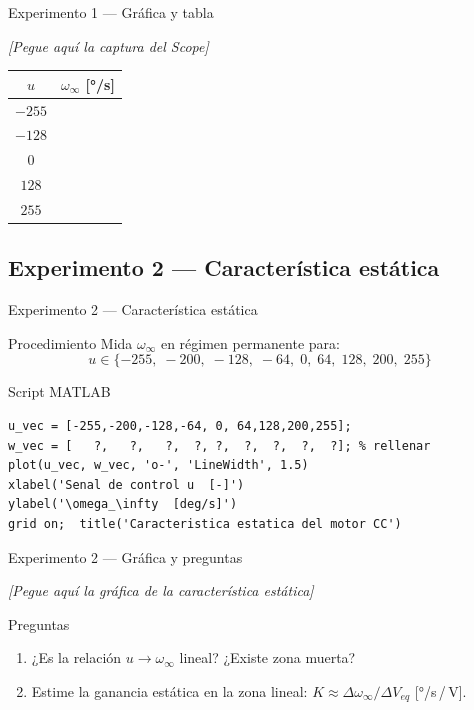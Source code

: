 \documentclass{beamer}
\begin{document}
\begin{frame}{Experimento 1 --- Gráfica y tabla}
\begin{center}
  \textit{[Pegue aquí la captura del Scope]}\\[2ex]
  \begin{tabular}{|c|c|}
    \hline
    $u$ & $\omega_{\infty}$ [°/s] \\ \hline
    $-255$ & \\ $-128$ & \\ $0$ & \\ $128$ & \\ $255$ & \\ \hline
  \end{tabular}
\end{center}
\end{frame}

\subsection{Experimento 2 --- Característica estática}

\begin{frame}[fragile]{Experimento 2 --- Característica estática}
\begin{block}{Procedimiento}
  Mida $\omega_\infty$ en régimen permanente para:
  \[ u \in \{-255,\;-200,\;-128,\;-64,\;0,\;64,\;128,\;200,\;255\} \]
\end{block}
\begin{block}{Script MATLAB}
  \begin{lstlisting}
u_vec = [-255,-200,-128,-64, 0, 64,128,200,255];
w_vec = [   ?,   ?,   ?,  ?, ?,  ?,  ?,  ?,  ?]; % rellenar
plot(u_vec, w_vec, 'o-', 'LineWidth', 1.5)
xlabel('Senal de control u  [-]')
ylabel('\omega_\infty  [deg/s]')
grid on;  title('Caracteristica estatica del motor CC')
\end{lstlisting}
\end{block}
\end{frame}

\begin{frame}{Experimento 2 --- Gráfica y preguntas}
\begin{center}
  \textit{[Pegue aquí la gráfica de la característica estática]}
\end{center}
\vspace{4pt}
\begin{block}{Preguntas}
  \begin{enumerate}
    \item ¿Es la relación $u \to \omega_\infty$ lineal? ¿Existe zona muerta?
    \item Estime la ganancia estática en la zona lineal:
          $K \approx \Delta\omega_\infty / \Delta V_{eq}$ [°/s\,/\,V].
  \end{enumerate}
\end{block}
\end{frame}
\end{document}
